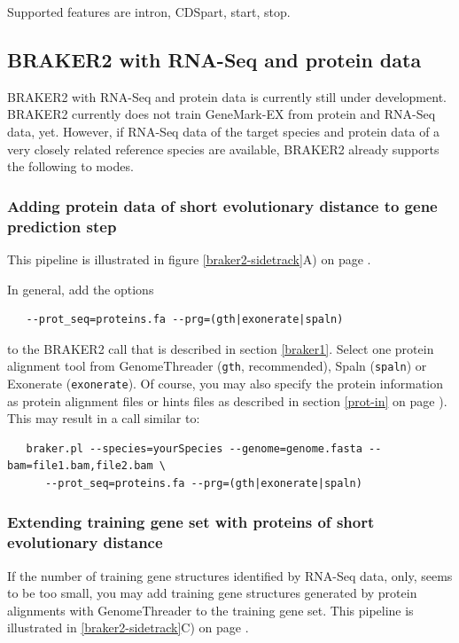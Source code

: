 \documentclass[a4paper,10pt]{report}
\begin{document}
Supported features are intron, CDSpart, start, stop.

\subsection{BRAKER2 with RNA-Seq and protein data}

BRAKER2 with RNA-Seq and protein data is currently still under development. BRAKER2 currently does not train GeneMark-EX from protein and RNA-Seq data, yet. However, if RNA-Seq data of the target species and protein data of a very closely related reference species are available, BRAKER2 already supports the following to modes.

\subsubsection{Adding protein data of short evolutionary distance to gene prediction step}

This pipeline is illustrated in figure \ref{braker2-sidetrack}A) on page \pageref{braker2-sidetrack}.

In general, add the options

\begin{verbatim}
   --prot_seq=proteins.fa --prg=(gth|exonerate|spaln)
\end{verbatim}

to the BRAKER2 call that is described in section \ref{braker1}. Select one protein alignment tool from GenomeThreader (\texttt{gth}, recommended), Spaln (\texttt{spaln}) or Exonerate (\texttt{exonerate}). Of course, you may also specify the protein information as protein alignment files or hints files as described in section \ref{prot-in} on page \pageref{prot-in}). This may result in a call similar to:

\begin{verbatim}
   braker.pl --species=yourSpecies --genome=genome.fasta --bam=file1.bam,file2.bam \
      --prot_seq=proteins.fa --prg=(gth|exonerate|spaln)
\end{verbatim}

\subsubsection{Extending training gene set with proteins of short evolutionary distance}

If the number of training gene structures identified by RNA-Seq data, only, seems to be too small, you may add training gene structures generated by protein alignments with GenomeThreader to the training gene set. This pipeline is illustrated in \ref{braker2-sidetrack}C) on page \pageref{braker2-sidetrack}.
\end{document}
